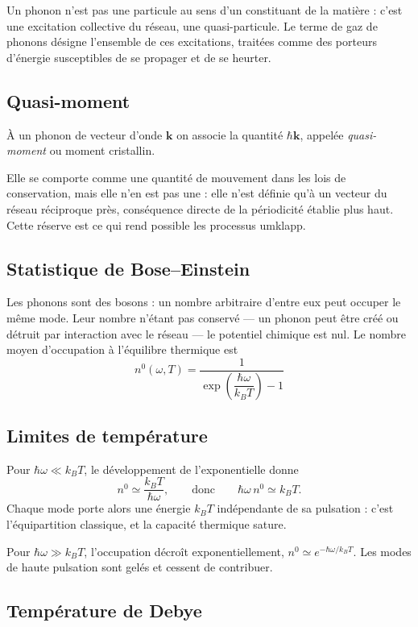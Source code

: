 \documentclass[11pt,a4paper]{article}
\begin{document}
Un phonon n'est pas une particule au sens d'un constituant de la matière : c'est une excitation
collective du réseau, une quasi-particule. Le terme de gaz de phonons désigne l'ensemble de ces
excitations, traitées comme des porteurs d'énergie susceptibles de se propager et de se heurter.

\subsection{Quasi-moment}

À un phonon de vecteur d'onde $\mathbf{k}$ on associe la quantité $\hbar\mathbf{k}$, appelée
\emph{quasi-moment} ou moment cristallin.

Elle se comporte comme une quantité de mouvement dans les lois de conservation, mais elle n'en est
pas une : elle n'est définie qu'à un vecteur du réseau réciproque près, conséquence directe de la
périodicité établie plus haut. Cette réserve est ce qui rend possible les processus umklapp.

\subsection{Statistique de Bose--Einstein}

Les phonons sont des bosons : un nombre arbitraire d'entre eux peut occuper le même mode. Leur
nombre n'étant pas conservé --- un phonon peut être créé ou détruit par interaction avec le réseau
--- le potentiel chimique est nul. Le nombre moyen d'occupation à l'équilibre thermique est
\[ \boxed{\;n^0(\omega, T) = \frac{1}{\exp\!\left(\dfrac{\hbar\omega}{k_B T}\right) - 1}\;} \]

\subsection{Limites de température}

Pour $\hbar\omega \ll k_B T$, le développement de l'exponentielle donne
\[ n^0 \simeq \frac{k_B T}{\hbar\omega} , \qquad\text{donc}\qquad \hbar\omega\, n^0 \simeq k_B T . \]
Chaque mode porte alors une énergie $k_B T$ indépendante de sa pulsation : c'est l'équipartition
classique, et la capacité thermique sature.

Pour $\hbar\omega \gg k_B T$, l'occupation décroît exponentiellement, $n^0 \simeq e^{-\hbar\omega/k_BT}$.
Les modes de haute pulsation sont gelés et cessent de contribuer.

\subsection{Température de Debye}
\end{document}
